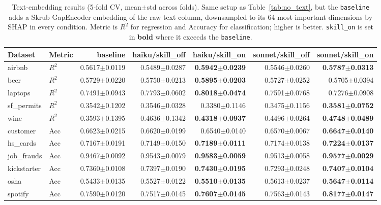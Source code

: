 \begin{table}[t]
\vspace{6pt}

\centering
\caption{Text-embedding results (5-fold CV, mean$\pm$std across folds). Same setup as Table~\ref{tab:no_text}, but the \texttt{baseline} adds a Skrub \textsf{GapEncoder} embedding of the raw text column, downsampled to its $64$ most important dimensions by SHAP in every condition. Metric is $R^2$ for regression and Accuracy for classification; higher is better. \texttt{skill\_on} is set in \textbf{bold} where it exceeds the \texttt{baseline}.}
\label{tab:text}
\footnotesize
\setlength{\tabcolsep}{3pt}
\begin{tabular}{llrrrrr}
\toprule
Dataset & Metric & baseline & haiku/skill\_off & haiku/skill\_on & sonnet/skill\_off & sonnet/skill\_on \\
\midrule
airbnb      & $R^2$ & 0.5617$\pm$0.0119 & 0.5489$\pm$0.0287 & \textbf{0.5942$\pm$0.0239} & 0.5546$\pm$0.0260 & \textbf{0.5787$\pm$0.0313} \\
beer        & $R^2$ & 0.5729$\pm$0.0220 & 0.5750$\pm$0.0213 & \textbf{0.5895$\pm$0.0203} & 0.5727$\pm$0.0252 & 0.5705$\pm$0.0394 \\
laptops     & $R^2$ & 0.7491$\pm$0.0943 & 0.7793$\pm$0.0602 & \textbf{0.8018$\pm$0.0474} & 0.7591$\pm$0.0768 & 0.7276$\pm$0.0908 \\
sf\_permits  & $R^2$ & 0.3542$\pm$0.1202 & 0.3546$\pm$0.0328 & 0.3380$\pm$0.1146 & 0.3475$\pm$0.1156 & \textbf{0.3581$\pm$0.0752} \\
wine        & $R^2$ & 0.3593$\pm$0.1395 & 0.4636$\pm$0.1342 & \textbf{0.4318$\pm$0.0937} & 0.4496$\pm$0.0264 & \textbf{0.4748$\pm$0.0489} \\
\midrule
customer    & Acc & 0.6623$\pm$0.0215 & 0.6620$\pm$0.0199 & 0.6540$\pm$0.0140 & 0.6570$\pm$0.0067 & \textbf{0.6647$\pm$0.0140} \\
hs\_cards    & Acc & 0.7167$\pm$0.0191 & 0.7149$\pm$0.0150 & \textbf{0.7189$\pm$0.0111} & 0.7174$\pm$0.0138 & \textbf{0.7224$\pm$0.0137} \\
job\_frauds  & Acc & 0.9467$\pm$0.0092 & 0.9543$\pm$0.0079 & \textbf{0.9583$\pm$0.0059} & 0.9513$\pm$0.0058 & \textbf{0.9577$\pm$0.0029} \\
kickstarter & Acc & 0.7360$\pm$0.0108 & 0.7397$\pm$0.0190 & \textbf{0.7430$\pm$0.0195} & 0.7293$\pm$0.0248 & \textbf{0.7407$\pm$0.0104} \\
osha        & Acc & 0.5433$\pm$0.0135 & 0.5527$\pm$0.0122 & \textbf{0.5510$\pm$0.0135} & 0.5613$\pm$0.0237 & \textbf{0.5647$\pm$0.0114} \\
spotify     & Acc & 0.7590$\pm$0.0120 & 0.7517$\pm$0.0145 & \textbf{0.7607$\pm$0.0145} & 0.7563$\pm$0.0143 & \textbf{0.8177$\pm$0.0147} \\
\bottomrule
\end{tabular}
\end{table}

